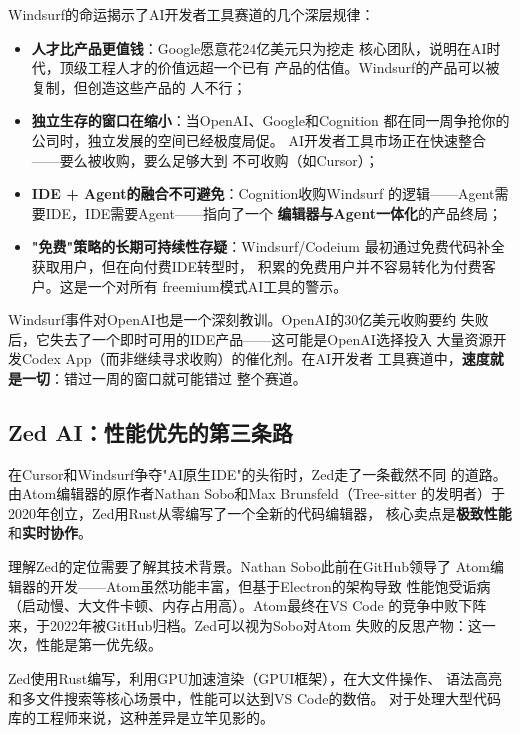 Windsurf的命运揭示了AI开发者工具赛道的几个深层规律：

\begin{itemize}
  \item \textbf{人才比产品更值钱}：Google愿意花24亿美元只为挖走
    核心团队，说明在AI时代，顶级工程人才的价值远超一个已有
    产品的估值。Windsurf的产品可以被复制，但创造这些产品的
    人不行；
  \item \textbf{独立生存的窗口在缩小}：当OpenAI、Google和Cognition
    都在同一周争抢你的公司时，独立发展的空间已经极度局促。
    AI开发者工具市场正在快速整合——要么被收购，要么足够大到
    不可收购（如Cursor）；
  \item \textbf{IDE + Agent的融合不可避免}：Cognition收购Windsurf
    的逻辑——Agent需要IDE，IDE需要Agent——指向了一个
    \textbf{编辑器与Agent一体化}的产品终局；
  \item \textbf{"免费"策略的长期可持续性存疑}：Windsurf/Codeium
    最初通过免费代码补全获取用户，但在向付费IDE转型时，
    积累的免费用户并不容易转化为付费客户。这是一个对所有
    freemium模式AI工具的警示。
\end{itemize}

Windsurf事件对OpenAI也是一个深刻教训。OpenAI的30亿美元收购要约
失败后，它失去了一个即时可用的IDE产品——这可能是OpenAI选择投入
大量资源开发Codex App（而非继续寻求收购）的催化剂。在AI开发者
工具赛道中，\textbf{速度就是一切}：错过一周的窗口就可能错过
整个赛道。

\subsection{Zed AI：性能优先的第三条路}
\label{subsec:zed}

在Cursor和Windsurf争夺"AI原生IDE"的头衔时，Zed走了一条截然不同
的道路。由Atom编辑器的原作者Nathan Sobo和Max Brunsfeld（Tree-sitter
的发明者）于2020年创立，Zed用Rust从零编写了一个全新的代码编辑器，
核心卖点是\textbf{极致性能}和\textbf{实时协作}。

理解Zed的定位需要了解其技术背景。Nathan Sobo此前在GitHub领导了
Atom编辑器的开发——Atom虽然功能丰富，但基于Electron的架构导致
性能饱受诟病（启动慢、大文件卡顿、内存占用高）。Atom最终在VS Code
的竞争中败下阵来，于2022年被GitHub归档。Zed可以视为Sobo对Atom
失败的反思产物：这一次，性能是第一优先级。

Zed使用Rust编写，利用GPU加速渲染（GPUI框架），在大文件操作、
语法高亮和多文件搜索等核心场景中，性能可以达到VS Code的数倍。
对于处理大型代码库的工程师来说，这种差异是立竿见影的。


